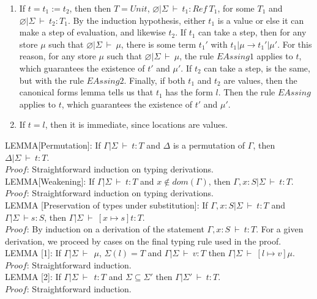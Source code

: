 \documentclass [proof]{article}
\newcommand{\tto}{\longrightarrow}
\newcommand{\env}{{\Gamma | \Sigma \ \vdash}}
\newcommand{\envE}{{\varnothing | \Sigma \ \vdash}}
\newcommand{\envEP}{{\Gamma | \Sigma \ \vdash \ }}
\begin{document}
\begin{enumerate}
\item If $t = t_1 := t_2$, then then $T = Unit$, $\envE \ t_1 : Ref \ T_1$, for some $T_1$ and $\envE \ t_2 : T_1$. By the induction hypothesis, either $t_1$ is a value or else it can make a step of evaluation, and likewise $t_2$. If $t_1$ can take a step, then for any store $\mu$ such that $\envE \ \mu$, there is some term $t_1'$ with $t_1|\mu \tto t_1'|\mu'$. For this reason, for any store $\mu$ such that $\envE \ \mu$, the rule $EAssing1$ applies to $t$, which guarantees the existence of $t'$ and $\mu'$. If $t_2$ can take a step, is the same, but with the rule $EAssing2$. Finally, if both $t_1$ and $t_2$ are values, then the canonical forms lemma tells us that $t_1$ has the form $l$. Then the rule $EAssing$ applies to $t$, which guarantees the existence of $t'$ and $\mu'$.
\item If $t = l$, then it is immediate, since locations are values.

\end{enumerate}

LEMMA[Permutation]: If $\env \ t : T$ and $\Delta$ is a permutation of $\Gamma$, then $\Delta | \Sigma \ \vdash \ t : T$.\\
$Proof$: Straightforward induction on typing derivations.\ \\

LEMMA[Weakening]: If $\env \ t : T$ and $x \not \in dom(\Gamma)$, then $\Gamma, x : S | \Sigma \ \vdash \ t:T$.\\
$Proof$: Straightforward induction on typing derivations.\ \\

LEMMA [Preservation of types under substitution]: If $\Gamma , x:S  | \Sigma \ \vdash \ t : T$ and $\env s : S$, then $\env \ [x \mapsto s]t : T$.\\
$Proof$: By induction on a derivation of the statement $ \Gamma, x:S \ \vdash \ t : T$. For a given derivation, we proceed by cases on the final typing rule used in the proof.\\

LEMMA [1]: If $\envEP \ \mu$, $\Sigma(l) = T$ and $ \env \ v:T$ then $\envEP [l \mapsto v]\mu$.\\
$Proof$: Straightforward induction.\ \\

LEMMA [2]: If $\envEP \ t : T$ and $\Sigma \subseteq \Sigma'$ then $\Gamma | \Sigma' \ \vdash \ t:T$.\\
$Proof$: Straightforward induction.\ \\
\end{document}
